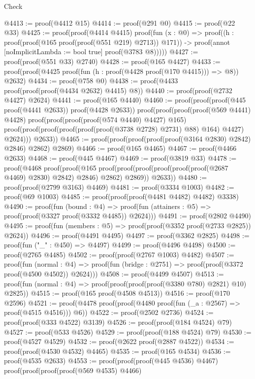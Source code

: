 \begin{lexlean}{Check}
\begin{coremodule}
@4413 := proof(@4412 @15)
@4414 := proof(@291 @0)
@4415 := proof(@22 @33)
@4425 := proof(proof(@4414 @4415)
      proof(fun (x : @0) =>
        proof((h : proof(proof(@165 proof(proof(@551 @219) @2713)) @171)) ->
          proof(annot [noImplicitLambda := bool true] proof(@3783 @8)))))
@4427 := proof(proof(@551 @33) @2740)
@4428 := proof(@165 @4427)
@4433 := proof(proof(@4425 proof(fun (h : proof(@4428 proof(@170 @4415))) => @8)) @2632)
@4434 := proof(@758 @0)
@4438 := proof(@4433 proof(proof(proof(@4434 @2632) @4415) @8))
@4440 := proof(proof(@2732 @4427) @2624)
@4441 := proof(@165 @4440)
@4460 := proof(proof(proof(@445 proof(@4441 @2633)) proof(@4428 @2633))
      proof(proof(proof(proof(@569 @4441) @4428)
            proof(proof(proof(proof(@574 @4440) @4427) @165)
                proof(proof(proof(proof(proof(proof(@3738 @2728) @2731) @88) @164) @4427) @2624)))
          @2633))
@4465 := proof(proof(proof(proof(proof(@3164 @2830) @2842) @2846) @2862) @2869)
@4466 := proof(@165 @4465)
@4467 := proof(@4466 @2633)
@4468 := proof(@445 @4467)
@4469 := proof(@3819 @33)
@4478 := proof(@4468
      proof(proof(@165
            proof(proof(proof(proof(proof(proof(@2687 @4469) @2830) @2842) @2846) @2862) @2869))
          @2633))
@4480 := proof(proof(@2799 @3163) @4469)
@4481 := proof(@3334 @1003)
@4482 := proof(@69 @1003)
@4485 := proof(proof(proof(@4481 @4482) @4482) @3338)
@4490 := proof(fun (bound : @4) =>
    proof(fun (attainers : @5) => proof(proof(@3327 proof(@3332 @4485)) @2624)))
@4491 := proof(@2802 @4490)
@4495 := proof(fun (members : @5) => proof(proof(@3352 proof(@2733 @2825)) @2624))
@4496 := proof(@4491 @4495)
@4497 := proof(@3362 @2825)
@4498 := proof(fun ("_" : @450) => @4497)
@4499 := proof(@4496 @4498)
@4500 := proof(@2765 @4485)
@4502 := proof(proof(@2767 @1003) @4482)
@4507 := proof(fun (normal : @4) =>
    proof(fun (bridge : @2751) => proof(proof(@3372 proof(@4500 @4502)) @2624)))
@4508 := proof(@4499 @4507)
@4513 := proof(fun (normal : @4) => proof(proof(proof(proof(@3380 @780) @2821) @10) @2825))
@4515 := proof(@165 proof(@4508 @4513))
@4516 := proof(@170 @2596)
@4521 := proof(@4478 proof(proof(@4480 proof(fun (_a : @2567) => proof(@4515 @4516))) @6))
@4522 := proof(@2502 @2736)
@4524 := proof(proof(@333 @4522) @3139)
@4526 := proof(proof(@184 @4524) @79)
@4527 := proof(@533 @4526)
@4529 := proof(proof(@188 @4524) @79)
@4530 := proof(@4527 @4529)
@4532 := proof(@2622 proof(@2887 @4522))
@4534 := proof(proof(@4530 @4532) @4465)
@4535 := proof(@165 @4534)
@4536 := proof(@4535 @2633)
@4553 := proof(proof(proof(@445 @4536) @4467)
      proof(proof(proof(proof(@569 @4535) @4466)

\end{coremodule}
\end{lexlean}
